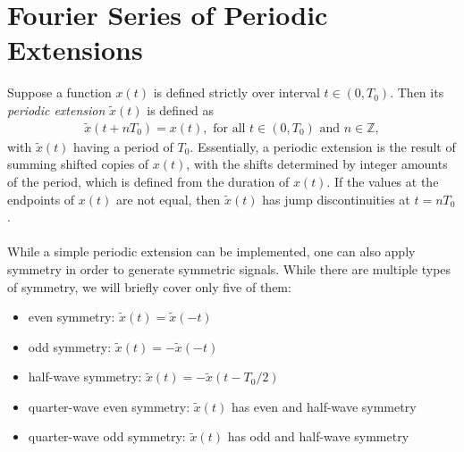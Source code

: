 \documentclass{report}
\begin{document}
\section{Fourier Series of Periodic Extensions}
Suppose a function $x(t)$ is defined strictly over interval $t\in(0,T_0)$. Then its \emph{periodic extension} $\tilde{x}(t)$ is defined as
\begin{align}
    \tilde{x}(t + nT_0) = x(t), \text{ for all } t\in(0,T_0) \text{ and } n\in\mathbb{Z},  
\end{align}
with $\tilde{x}(t)$ having a period of $T_0$. Essentially, a periodic extension is the result of summing shifted copies of $x(t)$, with the shifts determined 
by integer amounts of the period, which is defined from the duration of $x(t)$. If the values at the endpoints of $x(t)$ are not equal, then $\tilde{x}(t)$ has jump discontinuities at $t=nT_0$. 
\\ \\
While a simple periodic extension can be implemented, one can also apply symmetry in order to generate symmetric signals. While there are multiple types of symmetry, we will briefly cover only five of them:
\begin{itemize}
    \item even symmetry: $\tilde{x}(t)=\tilde{x}(-t)$
    \item odd symmetry: $\tilde{x}(t)=-\tilde{x}(-t)$
    \item half-wave symmetry: $\tilde{x}(t)=-\tilde{x}(t-T_0/2)$
    \item quarter-wave even symmetry: $\tilde{x}(t)$ has even and half-wave symmetry
    \item quarter-wave odd symmetry: $\tilde{x}(t)$ has odd and half-wave symmetry
\end{itemize}
\end{document}

